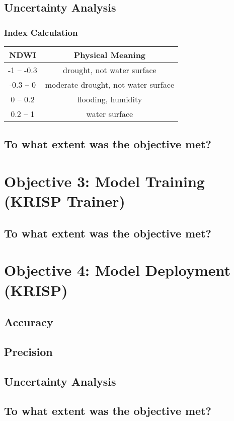 \subsection{Uncertainty Analysis}
\subsubsection{Index Calculation}
\begin{tabular}{|c|c|}
\hline
\textbf{NDWI} & \textbf{Physical Meaning} \\
\hline
-1 -- -0.3 & drought, not water surface \\
\hline
-0.3 -- 0 & moderate drought, not water surface \\
\hline
0 -- 0.2 & flooding, humidity \\
\hline
0.2 -- 1 & water surface \\
\hline
\end{tabular}


\subsection{To what extent was the objective met?}


\section{Objective 3: Model Training (KRISP Trainer)}
\subsection{}
\subsection{To what extent was the objective met?}

\section{Objective 4: Model Deployment (KRISP)}
\subsection{Accuracy}

\subsection{Precision}

\subsection{Uncertainty Analysis}

\subsection{To what extent was the objective met?}

